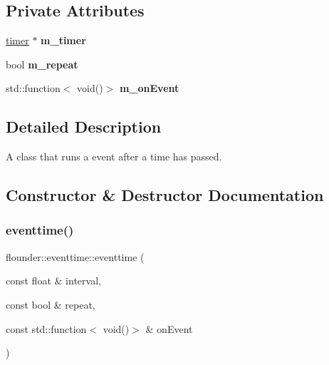 \subsection*{Private Attributes}
\begin{DoxyCompactItemize}
\item 
\mbox{\label{classflounder_1_1eventtime_a955a7db17c2f5011797a34fda333d2dc}} 
\hyperlink{classflounder_1_1timer}{timer} $\ast$ {\bfseries m\+\_\+timer}
\item 
\mbox{\label{classflounder_1_1eventtime_abf987190be93e422cd53a8e5dac07218}} 
bool {\bfseries m\+\_\+repeat}
\item 
\mbox{\label{classflounder_1_1eventtime_af793eee748651cb6d9a568b1845e4f4a}} 
std\+::function$<$ void()$>$ {\bfseries m\+\_\+on\+Event}
\end{DoxyCompactItemize}


\subsection{Detailed Description}
A class that runs a event after a time has passed. 



\subsection{Constructor \& Destructor Documentation}
\mbox{\label{classflounder_1_1eventtime_a20972724acf2b8b681a1754d59adeff3}} 
\subsubsection{\texorpdfstring{eventtime()}{eventtime()}}
{\footnotesize\ttfamily flounder\+::eventtime\+::eventtime (\begin{DoxyParamCaption}\item[{const float \&}]{interval,  }\item[{const bool \&}]{repeat,  }\item[{const std\+::function$<$ void()$>$ \&}]{on\+Event }\end{DoxyParamCaption})}



